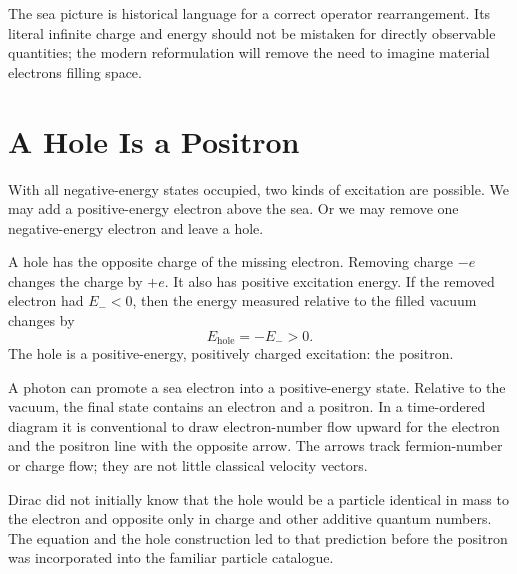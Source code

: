 The sea picture is historical language for a correct operator rearrangement. Its literal infinite charge and energy should not be mistaken for directly observable quantities; the modern reformulation will remove the need to imagine material electrons filling space.

\section{A Hole Is a Positron}

With all negative-energy states occupied, two kinds of excitation are possible. We may add a positive-energy electron above the sea. Or we may remove one negative-energy electron and leave a hole.

A hole has the opposite charge of the missing electron. Removing charge \(-e\) changes the charge by \(+e\). It also has positive excitation energy. If the removed electron had \(E_-<0\), then the energy measured relative to the filled vacuum changes by
\begin{equation}
E_{\mathrm{hole}}=-E_->0.
\end{equation}
The hole is a positive-energy, positively charged excitation: the positron.

A photon can promote a sea electron into a positive-energy state. Relative to the vacuum, the final state contains an electron and a positron. In a time-ordered diagram it is conventional to draw electron-number flow upward for the electron and the positron line with the opposite arrow. The arrows track fermion-number or charge flow; they are not little classical velocity vectors.

\begin{classroomqa}
\end{classroomqa}

Dirac did not initially know that the hole would be a particle identical in mass to the electron and opposite only in charge and other additive quantum numbers. The equation and the hole construction led to that prediction before the positron was incorporated into the familiar particle catalogue.

